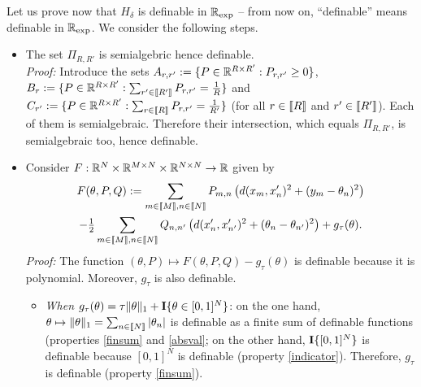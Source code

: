 Let us prove  now that $H_{\delta}$ is definable in  $\mathbb{R}_{\exp}$ -- from now
on, ``definable'' means definable in  $\mathbb{R}_{\exp}$. We consider the following
steps.
\begin{itemize}
\item The set $\Pi_{R,R'}$ is semialgebric hence definable.\\
  \textit{Proof:}               Introduce               the               sets
  $A_{r,r'}   :=   \{P  \in   \mathbb{R}^{R\times   R'}   :  P_{r,r'}   \geq   0\}$,
  $B_{r} :=  \{P \in \mathbb{R}^{R\times  R'} : \sum_{r'  \in \llbracket R'\rrbracket}  P_{r,r'} =
  \tfrac{1}{R}\}$                                                          and
  $C_{r'} :=  \{P \in  \mathbb{R}^{R\times R'}  : \sum_{r \in  \llbracket R\rrbracket}  P_{r,r'} =
  \tfrac{1}{R'}\}$ (for all  $r\in \llbracket R\rrbracket$ and $r'\in \llbracket  R'\rrbracket$).  Each of
  them  is   semialgebraic.   Therefore   their  intersection,   which  equals
  $\Pi_{R,R'}$, is semialgebraic too, hence definable.
  
\item                                                                 Consider
  $F: \mathbb{R}^{N} \times \mathbb{R}^{M\times N} \times \mathbb{R}^{N\times N} \to \mathbb{R}$ given
  by
  \begin{multline*}
    F(\theta,  P,  Q)   :=  \sum_{m\in  \llbracket  M\rrbracket,  n\in   \llbracket  N\rrbracket}  P_{m,n}
    \left(d(x_{m}, x_{n}')^{2} + (y_{m} -
      \theta_{n})^{2}\right)\\
    -   \tfrac{1}{2}   \sum_{m\in   \llbracket   M\rrbracket,  n\in   \llbracket   N\rrbracket}   Q_{n,n'}
    \left(d(x'_{n},  x'_{n'})^{2} +  (\theta_{n}  - \theta_{n'})^{2}\right)  +
    g_{\tau}(\theta).
  \end{multline*}
  \textit{Proof:}                         The                         function
  $(\theta,P) \mapsto F(\theta,P,Q) -  g_{\tau} (\theta)$ is definable because
  it is polynomial. Moreover, $g_{\tau}$ is also definable.
  \begin{itemize}
  \item                                                          \textit{When}
    $g_{\tau}(\theta) = \tau \|\theta\|_{1} + \textbf{I}\{\theta \in [0,1]^{N}\}$: on
    the                                one                               hand,
    $\theta    \mapsto    \|\theta\|_{1}     =    \sum_{n    \in    \llbracket
      N\rrbracket}|\theta_{n}|$  is definable  as  a finite  sum of  definable
    functions (properties  \ref{finsum} and  \ref{absval}; on the  other hand,
    $\textbf{I}\{[0,1]^{N}\}$ is definable because $[0,1]^{N}$ is definable (property
    \ref{indicator}).    Therefore,   $g_{\tau}$    is   definable   (property
    \ref{finsum}).
 

\end{itemize}
\end{itemize}
